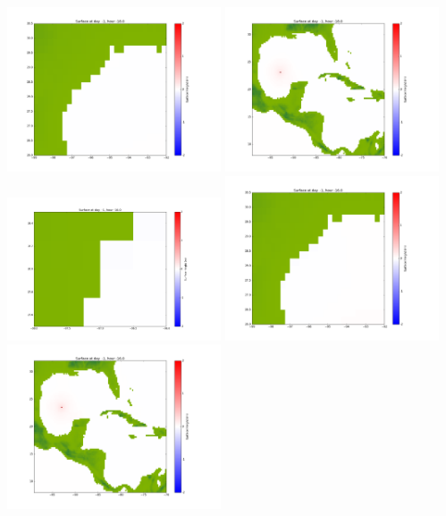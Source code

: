 \documentclass[11pt]{article}
\begin{document}
\includegraphics[width=0.475\textwidth]{frame0003fig1002.png}
\vskip 10pt 
\includegraphics[width=0.475\textwidth]{frame0003fig1003.png}
\vskip 10pt 
\includegraphics[width=0.475\textwidth]{frame0004fig1001.png}
\includegraphics[width=0.475\textwidth]{frame0004fig1002.png}
\vskip 10pt 
\includegraphics[width=0.475\textwidth]{frame0004fig1003.png}
\end{document}
